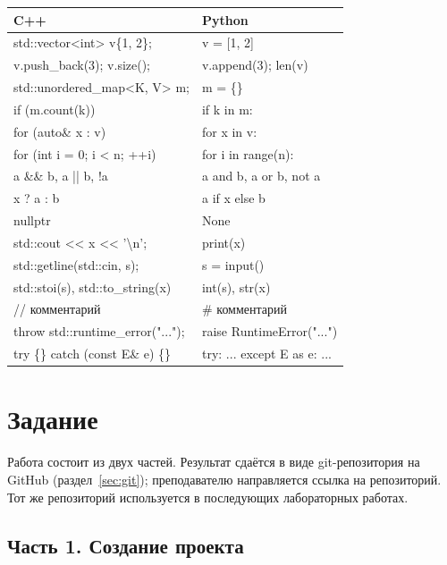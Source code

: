 \documentclass[11pt,a4paper]{article}
\begin{document}
\begin{tabularx}{\linewidth}{@{}>{\ttfamily}X>{\ttfamily}X@{}}
\toprule
\textrm{\textbf{C++}} & \textrm{\textbf{Python}} \\
\midrule
std::vector<int> v\{1, 2\}; & v = [1, 2] \\
v.push\_back(3); v.size(); & v.append(3); len(v) \\
std::unordered\_map<K, V> m; & m = \{\} \\
if (m.count(k)) & if k in m: \\
for (auto\& x : v) & for x in v: \\
for (int i = 0; i < n; ++i) & for i in range(n): \\
a \&\& b, a || b, !a & a and b, a or b, not a \\
x ? a : b & a if x else b \\
nullptr & None \\
std::cout << x << '\textbackslash n'; & print(x) \\
std::getline(std::cin, s); & s = input() \\
std::stoi(s), std::to\_string(x) & int(s), str(x) \\
// комментарий & \# комментарий \\
throw std::runtime\_error("..."); & raise RuntimeError("...") \\
try \{\} catch (const E\& e) \{\} & try: ... except E as e: ... \\
\bottomrule
\end{tabularx}

\section{Задание}

Работа состоит из двух частей. Результат сдаётся в виде git-репозитория
на GitHub (раздел~\ref{sec:git}); преподавателю направляется ссылка на репозиторий.
Тот же репозиторий используется в последующих лабораторных работах.

\subsection{Часть 1. Создание проекта}
\end{document}
